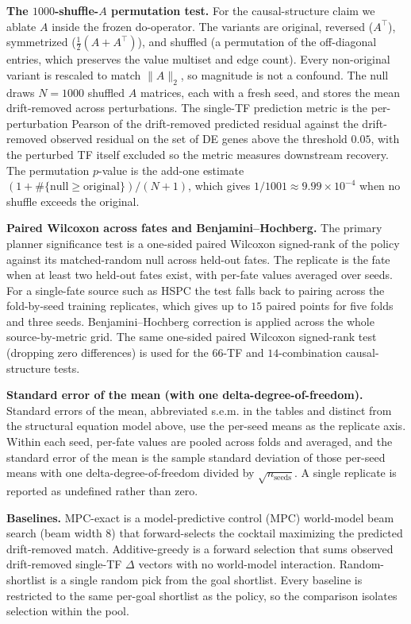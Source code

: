 \textbf{The $1000$-shuffle-$A$ permutation test.} For the causal-structure claim we ablate
$A$ inside the frozen do-operator. The variants are original, reversed ($A^{\top}$),
symmetrized ($\tfrac12(A+A^{\top})$), and shuffled (a permutation of the off-diagonal
entries, which preserves the value multiset and edge count). Every non-original variant is
rescaled to
match $\lVert A\rVert_2$, so magnitude is not a confound. The null draws $N{=}1000$ shuffled
$A$ matrices, each with a fresh seed, and stores the mean drift-removed \PearsonDEG
across perturbations. The single-TF prediction metric is the per-perturbation Pearson of the
drift-removed predicted residual against the drift-removed observed residual on the set of
DE genes above the threshold $0.05$, with the perturbed TF itself excluded so the metric
measures downstream recovery. The permutation $p$-value is the add-one estimate
$(1+\#\{\text{null}\ge\text{original}\})/(N+1)$, which gives $1/1001\approx9.99\times10^{-4}$
when no shuffle exceeds the original.

\textbf{Paired Wilcoxon across fates and Benjamini--Hochberg.} The primary planner
significance test is a one-sided paired Wilcoxon signed-rank of the policy against its
matched-random null across held-out fates. The replicate is the fate when at least two
held-out fates exist, with per-fate values
averaged over seeds. For a single-fate source such as HSPC the test falls back to pairing
across the fold-by-seed training replicates, which gives up to $15$ paired points for five
folds and three seeds. Benjamini--Hochberg correction is applied across the whole
source-by-metric grid. The same one-sided paired Wilcoxon signed-rank test (dropping zero
differences) is used for the $66$-TF and $14$-combination causal-structure tests.

\textbf{Standard error of the mean (with one delta-degree-of-freedom).} Standard errors of the
mean, abbreviated s.e.m. in the tables and distinct from the structural equation model above,
use the per-seed means as the replicate axis. Within each seed, per-fate values are pooled
across folds and averaged, and the standard error of the mean is the sample standard
deviation of those per-seed means with one delta-degree-of-freedom
divided by $\sqrt{n_{\mathrm{seeds}}}$. A single replicate is reported as undefined rather
than zero.

\textbf{Baselines.} MPC-exact is a model-predictive control (MPC) world-model beam search (beam width $8$) that
forward-selects the cocktail maximizing the predicted drift-removed match. Additive-greedy
is a forward selection that sums observed drift-removed single-TF $\Delta$ vectors with no
world-model interaction. Random-shortlist is a single
random pick from the goal shortlist. Every baseline is restricted to the same per-goal
shortlist as the policy, so the comparison isolates selection within the pool.

